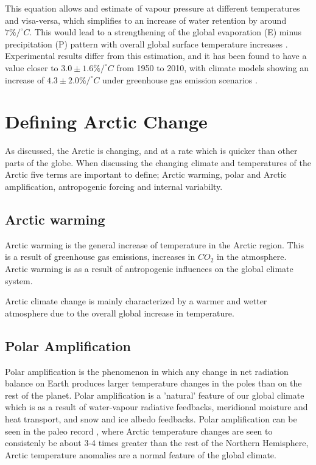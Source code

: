 \documentclass[12pt, oneside]{article}
\begin{document}
This equation allows and estimate of vapour pressure at different temperatures and visa-versa, which simplifies to an increase of water retention by around $7\% / ^{\circ} C $. This would lead to a strengthening of the global evaporation (E) minus precipitation (P) pattern with overall global surface temperature increases \cite{held2006robust}. Experimental results differ from this estimation, and it has been found to have a value closer to $3.0 \pm 1.6 \% / ^{\circ} C $ from 1950 to 2010, with climate models showing an increase of $4.3 \pm 2.0 \% / ^{\circ} C $ under greenhouse gas emission scenarios \cite{Skliris2016}. 






\section{Defining Arctic Change}\label{arctic change}
As discussed, the Arctic is changing, and at a rate which is quicker than other parts of the globe. When discussing the changing climate and temperatures of the Arctic five terms are important to define; Arctic warming, polar and Arctic amplification, antropogenic forcing and internal variabilty. 



\subsection{Arctic warming}
Arctic warming is the general increase of temperature in the Arctic region. This is a result of greenhouse gas emissions, increases in $CO_2$ in the atmosphere. Arctic warming is as a result of antropogenic influences on the global climate system. 

Arctic climate change is mainly characterized by a warmer and wetter atmosphere due to the overall global increase in temperature. 

\subsection{Polar Amplification}\label{polar_amplification}
Polar amplification is the phenomenon in which any change in net radiation balance on Earth produces larger temperature changes in the poles than on the rest of the planet. Polar amplification is a 'natural' feature of our global climate which is as a result of water-vapour radiative feedbacks, meridional moisture and heat transport, and snow and ice albedo feedbacks. Polar amplification can be seen in the paleo record \cite{miller2010arctic}, where Arctic temperature changes are seen to consistenly be about 3-4 times greater than the rest of the Northern Hemisphere, Arctic temperature anomalies are a normal feature of the global climate.
\end{document}
